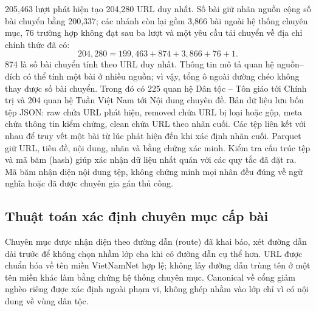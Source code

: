 205,463 lượt phát hiện tạo 204,280 URL duy nhất. Số bài giữ nhãn nguồn cộng số bài chuyển bằng 200,337; các nhánh còn lại gồm 3,866 bài ngoài hệ thống chuyên mục, 76 trường hợp không đạt sau ba lượt và một yêu cầu tải chuyển về địa chỉ chính thức đã có:
\begin{equation}204{,}280=199{,}463+874+3{,}866+76+1.\end{equation}
874 là số bài chuyển tính theo URL duy nhất. Thông tin mô tả quan hệ nguồn--đích có thể tính một bài ở nhiều nguồn; vì vậy, tổng ô ngoài đường chéo không thay được số bài chuyển. Trong đó có 225 quan hệ Dân tộc -- Tôn giáo tới Chính trị và 204 quan hệ Tuần Việt Nam tới Nội dung chuyên đề.
\CorpusAuditDiagram
Bản dữ liệu lưu bốn tệp JSON: raw chứa URL phát hiện, removed chứa URL bị loại hoặc gộp, meta chứa thông tin kiểm chứng, clean chứa URL theo nhãn cuối. Các tệp liên kết với nhau để truy vết một bài từ lúc phát hiện đến khi xác định nhãn cuối. Parquet giữ URL, tiêu đề, nội dung, nhãn và bằng chứng xác minh. Kiểm tra cấu trúc tệp và mã băm (hash) giúp xác nhận dữ liệu nhất quán với các quy tắc đã đặt ra. Mã băm nhận diện nội dung tệp, không chứng minh mọi nhãn đều đúng về ngữ nghĩa hoặc đã được chuyên gia gán thủ công.



\subsection{Thuật toán xác định chuyên mục cấp bài}
Chuyên mục được nhận diện theo đường dẫn (route) đã khai báo, xét đường dẫn dài trước để không chọn nhầm lớp cha khi có đường dẫn cụ thể hơn. URL được chuẩn hóa về tên miền VietNamNet hợp lệ; không lấy đường dẫn trùng tên ở một tên miền khác làm bằng chứng hệ thống chuyên mục. Canonical về cổng giảm nghèo riêng được xác định ngoài phạm vi, không ghép nhầm vào lớp chỉ vì có nội dung về vùng dân tộc.

